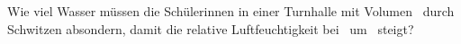 Wie viel Wasser müssen die Schülerinnen in einer Turnhalle mit Volumen \VTO\ durch Schwitzen absondern, damit die relative Luftfeuchtigkeit bei \thTO\ um \dfiO\ steigt?
